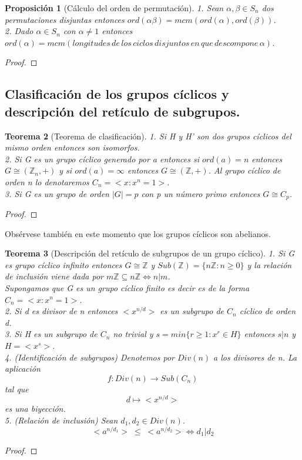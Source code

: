 \documentclass{article}
\theoremstyle{theorem-style}  %
\newtheorem{theorem}{Teorema}[section]  %
\newtheorem{proposition}[theorem]{Proposición}
\theoremstyle{definition-style}
\theoremstyle{example-style}
\begin{document}
\begin{proposition}[Cálculo del orden de permutación]
1. Sean $\alpha,\beta \in S_n$ dos permutaciones disjuntas entonces $ord(\alpha\beta) = mcm(ord(\alpha),ord(\beta))$.\\
2. Dado $\alpha \in S_n$ con $\alpha \neq 1$ entonces $ord(\alpha) = mcm(longitudes \, de \, los \, ciclos \, disjuntos \, en \, que \, descompone \, \alpha)$.
\end{proposition}
\begin{proof}

\end{proof}

\subsection{Clasificación de los grupos cíclicos y descripción del retículo de subgrupos.}

\begin{theorem}[Teorema de clasificación]
1. Si H y H' son dos grupos cíclicos del mismo orden entonces son isomorfos.\\
2. Si G es un grupo cíclico generado por a entonces si $ord(a) = n$ entonces $G \cong (\mathbb{Z}_n,+)$ y si $ord(a) = \infty$ entonces $G \cong (\mathbb{Z},+)$. Al grupo cíclico de orden n lo denotaremos $C_n = <x:x^n = 1>$.\\
3. Si G es un grupo de orden $|G| = p$ con p un número primo entonces $G \cong C_p$.
\end{theorem}
\begin{proof}

\end{proof}

Obsérvese también en este momento que los grupos cíclicos son abelianos.

\begin{theorem}[Descripción del retículo de subgrupos de un grupo cíclico]
1. Si G es grupo cíclico infinito entonces $G \cong \mathbb{Z}$ y $Sub(\mathbb{Z}) = \{n\mathbb{Z}:n \ge 0\}$ y la relación de inclusión viene dada por $m\mathbb{Z} \subseteq n\mathbb{Z} \iff n|m$. \\
Supongamos que G es un grupo cíclico finito es decir es de la forma $C_n = <x:x^n = 1>$.\\
2. Si d es divisor de n entonces $<x^{n/d}>$ es un subgrupo de $C_n$ cíclico de orden d. \\
3. Si H es un subgrupo de $C_n$ no trivial y $s = min\{r \ge 1:x^r \in H\}$ entonces $s|n$ y $H = <x^s>$. \\
4. (Identificación de subgrupos) Denotemos por $Div(n)$ a los divisores de n. La aplicación $$f:Div(n) \rightarrow Sub(C_n)$$ tal que $$d \mapsto <x^{n/d}>$$ es una biyección.  \\
5. (Relación de inclusión) Sean $d_1,d_2 \in Div(n)$. $$<a^{n/d_1}> \; \le \; <a^{n/d_2}> \iff d_1|d_2$$ 
\end{theorem}
\begin{proof}

\end{proof}
\end{document}

